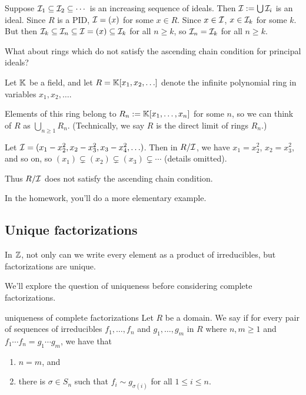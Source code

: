 \documentclass[12pt,letterpaper]{report}
\begin{document}
\begin{thmproof}
  Suppose $\mathcal{I}_1 \subseteq \mathcal{I}_2 \subseteq \cdots$ is an increasing sequence of ideals.
  Then $\mathcal{I} := \bigcup \mathcal{I}_i$ is an ideal.
  Since $R$ is a PID, $\mathcal{I} = (x)$ for some $x \in R$.
  Since $x \in \mathcal{I}$, $x \in \mathcal{I}_k$ for some $k$.
  But then $\mathcal{I}_k \subseteq \mathcal{I}_n \subseteq \mathcal{I} = (x) \subseteq \mathcal{I}_k$ for all
  $n \geq k$, so $\mathcal{I}_n = \mathcal{I}_k$ for all $n \geq k$.
\end{thmproof}

What about rings which do not satisfy the ascending chain condition for principal ideals?

\begin{ex}
  Let $\mathbb{K}$ be a field, and let $R = \mathbb{K}[x_1, x_2, \ldots]$ denote the infinite polynomial ring in
  variables $x_1, x_2, \ldots$.

  Elements of this ring belong to $R_n := \mathbb{K}[x_1, \ldots, x_n]$ for some $n$, so we can think of
  $R$ as $\bigcup_{n \geq 1} R_n$.
  (Technically, we say $R$ is the direct limit of rings $R_n$.)

  Let $\mathcal{I} = (x_1 - x_2^2, x_2 - x_3^2, x_3 - x_4^2, \ldots)$.
  Then in $R/\mathcal{I}$, we have $x_1 = x_2^2$, $x_2 = x_3^2$, and so on, so
  $(x_1) \subsetneq (x_2) \subsetneq (x_3) \subsetneq \cdots$ (details omitted).

  Thus $R/\mathcal{I}$ does not satisfy the ascending chain condition.
\end{ex}

In the homework, you'll do a more elementary example.

\pagebreak
\subsection{Unique factorizations}

In $\mathbb{Z}$, not only can we write every element as a product of irreducibles, but factorizations are
unique.

We'll explore the question of uniqueness before considering complete factorizations.

\begin{defn}{uniqueness of complete factorizations}{}
  Let $R$ be a domain.
  We say  if for every pair of sequences
  of irreducibles $f_1, \ldots, f_n$ and $g_1, \ldots, g_m$ in $R$ where
  $n, m \geq 1$ and $f_1 \cdots f_n = g_1 \cdots g_m$, we have that
  \begin{enumerate}
    \item $n = m$, and
    \item there is $\sigma \in S_n$ such that $f_i \sim g_{\sigma(i)}$ for all $1 \leq i \leq n$.
  \end{enumerate}
\end{defn}
\end{document}
